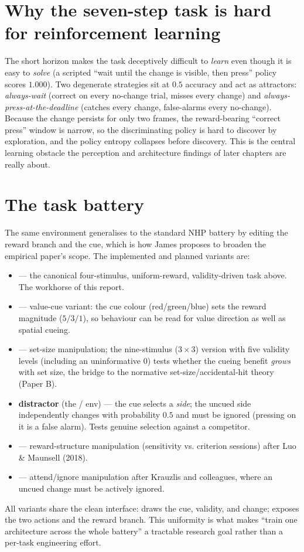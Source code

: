 \section{Why the seven-step task is hard for reinforcement learning}
The short horizon makes the task deceptively difficult to \emph{learn} even though it is
easy to \emph{solve} (a scripted ``wait until the change is visible, then press'' policy
scores $1.000$). Two degenerate strategies sit at $0.5$ accuracy and act as attractors:
\emph{always-wait} (correct on every no-change trial, misses every change) and
\emph{always-press-at-the-deadline} (catches every change, false-alarms every no-change).
Because the change persists for only two frames, the reward-bearing ``correct press''
window is narrow, so the discriminating policy is hard to discover by exploration, and the
policy entropy collapses before discovery. This is the central learning obstacle the
perception and architecture findings of later chapters are really about.

\section{The task battery}
The same environment generalises to the standard NHP battery by editing the reward branch
and the cue, which is how James proposes to broaden the empirical paper's scope. The
implemented and planned variants are:
\begin{itemize}
\item \textbf{} --- the canonical four-stimulus, uniform-reward,
validity-driven task above. The workhorse of this report.
\item \textbf{} --- value-cue variant: the cue colour (red/green/blue) sets the
reward magnitude ($5/3/1$), so behaviour can be read for value direction as well as
spatial cueing.
\item \textbf{} --- set-size manipulation; the nine-stimulus
($3\times3$) version with five validity levels (including an uninformative $0$) tests
whether the cueing benefit \emph{grows} with set size, the bridge to the normative
set-size/accidental-hit theory (Paper B).
\item \textbf{distractor} (the / env) --- the cue selects a
\emph{side}; the uncued side independently changes with probability $0.5$ and must be
ignored (pressing on it is a false alarm). Tests genuine selection against a competitor.
\item \textbf{} --- reward-structure manipulation (sensitivity vs.
criterion sessions) after Luo \& Maunsell (2018).
\item \textbf{} --- attend/ignore manipulation after Krauzlis and
colleagues, where an uncued change must be actively ignored.
\end{itemize}
All variants share the clean  interface:  draws the
cue, validity, and change;  exposes the two actions and the reward branch. This
uniformity is what makes ``train one architecture across the whole battery'' a tractable
research goal rather than a per-task engineering effort.

